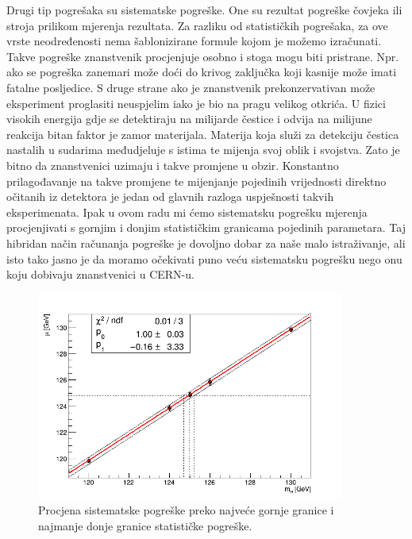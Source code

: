 \documentclass[12pt,a4paper,oneside]{article}
\begin{document}
\begin{linenumbers}
		
		Drugi tip pogrešaka su sistematske pogreške. One su rezultat pogreške čovjeka ili stroja prilikom mjerenja rezultata. Za razliku od statističkih pogrešaka, za ove vrste neodređenosti nema šablonizirane formule kojom je možemo izračunati. Takve pogreške znanstvenik procjenjuje osobno i stoga mogu biti pristrane. Npr. ako se pogreška zanemari može doći do krivog zaključka koji kasnije može imati fatalne posljedice. S druge strane ako je znanstvenik prekonzervativan može eksperiment proglasiti neuspjelim iako je bio na pragu velikog otkrića.
		U fizici visokih energija gdje se detektiraju na milijarde čestice i odvija na milijune reakcija bitan faktor je zamor materijala. Materija koja služi za detekciju čestica nastalih u sudarima međudjeluje s istima te mijenja svoj oblik i svojstva. Zato je bitno da znanstvenici uzimaju i takve promjene u obzir. Konstantno prilagođavanje na takve promjene te mijenjanje pojedinih vrijednosti direktno očitanih iz detektora je jedan od glavnih razloga uspješnosti takvih eksperimenata.
		Ipak u ovom radu mi ćemo sistematsku pogrešku mjerenja procjenjivati s gornjim i donjim statističkim granicama pojedinih parametara. Taj hibridan način računanja pogreške je dovoljno dobar za naše malo istraživanje, ali isto tako jasno je da moramo očekivati puno veću sistematsku pogrešku nego onu koju dobivaju znanstvenici u CERN-u.  
		
		\begin{figure}[H]
			\centering
			\includegraphics[width=0.9\textwidth]{sist-pogreska-fit-19-8.png}
			\caption[Procjena sistematske pogreške preko najveće gornje granice i najmanje donje granice statističke pogreške.]{\label{sl:sl9} Procjena sistematske pogreške preko najveće gornje granice i najmanje donje granice statističke pogreške.}
		\end{figure}
		

\end{linenumbers}
\end{document}
